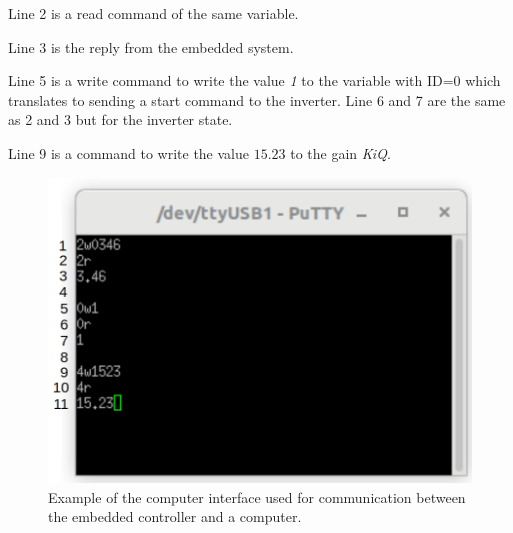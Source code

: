 Line 2 is a read command of the same variable. 

Line 3 is the reply from the embedded system.

Line 5 is a write command to write the value \textit{1} to the variable with ID=0 which translates to sending a start command to the inverter. Line 6 and 7 are the same as 2 and 3 but for the inverter state.

Line 9 is a command to write the value $15.23$ to the gain \textit{Ki\textunderscore Q}.

\begin{figure}[H]
	\centering
	\includegraphics[width=0.65\linewidth]{pictures/software/pc_interface_terminal.png}
	\caption{Example of the computer interface used for communication between the embedded controller and a computer.}
	\label{fig:pc_interface}
\end{figure}